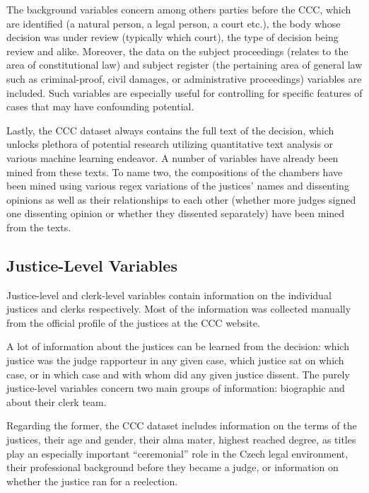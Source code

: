 \documentclass[
  11pt,
]{article}
\begin{document}
The background variables concern among others parties before the CCC,
which are identified (a natural person, a legal person, a court etc.),
the body whose decision was under review (typically which court), the
type of decision being review and alike. Moreover, the data on the
subject proceedings (relates to the area of constitutional law) and
subject register (the pertaining area of general law such as
criminal-proof, civil damages, or administrative proceedings) variables
are included. Such variables are especially useful for controlling for
specific features of cases that may have confounding potential.

Lastly, the CCC dataset always contains the full text of the decision,
which unlocks plethora of potential research utilizing quantitative text
analysis or various machine learning endeavor. A number of variables
have already been mined from these texts. To name two, the compositions
of the chambers have been mined using various regex variations of the
justices' names and dissenting opinions as well as their relationships
to each other (whether more judges signed one dissenting opinion or
whether they dissented separately) have been mined from the texts.

\hypertarget{justice-level-variables}{%
\subsection{Justice-Level Variables}\label{justice-level-variables}}

Justice-level and clerk-level variables contain information on the
individual justices and clerks respectively. Most of the information was
collected manually from the official profile of the justices at the CCC
website.

A lot of information about the justices can be learned from the
decision: which justice was the judge rapporteur in any given case,
which justice sat on which case, or in which case and with whom did any
given justice dissent. The purely justice-level variables concern two
main groups of information: biographic and about their clerk team.

Regarding the former, the CCC dataset includes information on the terms
of the justices, their age and gender, their alma mater, highest reached
degree, as titles play an especially important ``ceremonial'' role in
the Czech legal environment, their professional background before they
became a judge, or information on whether the justice ran for a
reelection.
\end{document}
